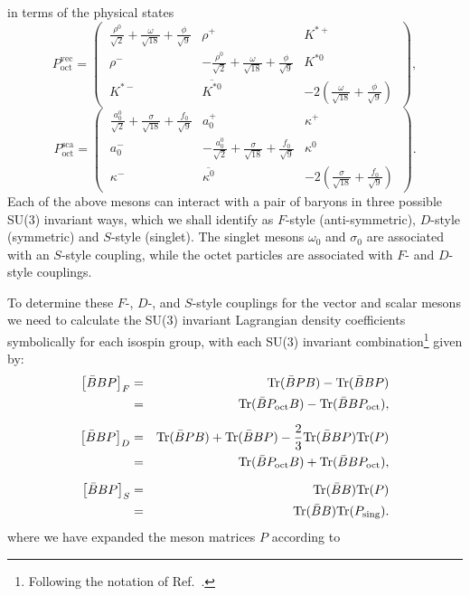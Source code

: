 \documentclass[11pt,a4paper,twoside]{carrollthesis}
\newcommand{\be}{\begin{equation}}
\newcommand{\ee}{\end{equation}}
\newcommand{\bea}{\begin{eqnarray}}
\newcommand{\eea}{\end{eqnarray}}
\begin{document}
in terms of the physical states
%
\be P^\textrm{vec}_\textrm{oct} = \left( \
\begin{matrix}
\frac{\rho^0}{\sqrt{2}}+\frac{\omega}{\sqrt{18}}+\frac{\phi}{\sqrt{9}}
& \rho^+ & K^{*+} \\ \rho^- &
-\frac{\rho^0}{\sqrt{2}}+\frac{\omega}{\sqrt{18}}+\frac{\phi}{\sqrt{9}}
& K^{*0} \\ K^{*-} & \overline{K^{*0}} &
-2\left(\frac{\omega}{\sqrt{18}}+\frac{\phi}{\sqrt{9}}\right)
\end{matrix} \ \right),
\ee
%
\be P^\textrm{sca}_\textrm{oct} = \left( \
\begin{matrix}
\frac{a_0^0}{\sqrt{2}}+\frac{\sigma}{\sqrt{18}}+\frac{f_0}{\sqrt{9}}
& a_0^+ & \kappa^{+} \\ a_0^- &
-\frac{a_0^0}{\sqrt{2}}+\frac{\sigma}{\sqrt{18}}+\frac{f_0}{\sqrt{9}}
& \kappa^{0} \\ \kappa^{-} & \overline{\kappa^{0}} &
-2\left(\frac{\sigma}{\sqrt{18}}+\frac{f_0}{\sqrt{9}}\right)
\end{matrix} \ \right).
\ee
%
Each of the above mesons can interact with a pair of baryons in three
possible SU(3) invariant ways, which we shall identify as $F$-style
(anti-symmetric), $D$-style (symmetric) and $S$-style
(singlet). The singlet mesons $\omega_0$ and $\sigma_0$ are associated
with an $S$-style coupling, while the octet particles are associated
with $F$- and $D$-style couplings.\par
%
To determine these $F$-, $D$-, and $S$-style couplings for the vector
and scalar mesons we need to calculate the SU(3) invariant Lagrangian
density coefficients symbolically for each isospin group, with each
SU(3) invariant combination\footnote{Following the notation
  of Ref.~\cite{Rijken:1998yy}.} given by:
%
\bea \nonumber \left[ \bar{B}BP \right]_F &= &{\rm Tr}(\bar{B}PB)-{\rm
  Tr}(\bar{B}BP) \\ \nonumber &= &{\rm Tr}(\bar{B}P_{\rm oct}B)-{\rm
  Tr}(\bar{B}BP_{\rm oct}), \\[2mm] \left[ \bar{B}BP \right]_D &=
&{\rm Tr}(\bar{B}PB)+{\rm Tr}(\bar{B}BP)-\frac{2}{3}{\rm
  Tr}(\bar{B}BP){\rm Tr}(P) \\ \nonumber &= &{\rm Tr}(\bar{B}P_{\rm
  oct}B)+{\rm Tr}(\bar{B}BP_{\rm oct}), \\[2mm] \nonumber \left[
  \bar{B}BP \right]_S &= &{\rm Tr}(\bar{B}B){\rm Tr}(P) \\ \nonumber
&= &{\rm Tr}(\bar{B}B){\rm Tr}(P_{\rm sing}).\label{eq:SU3invcombs}
\eea
%
where we have expanded the meson matrices $P$ according to
\end{document}
